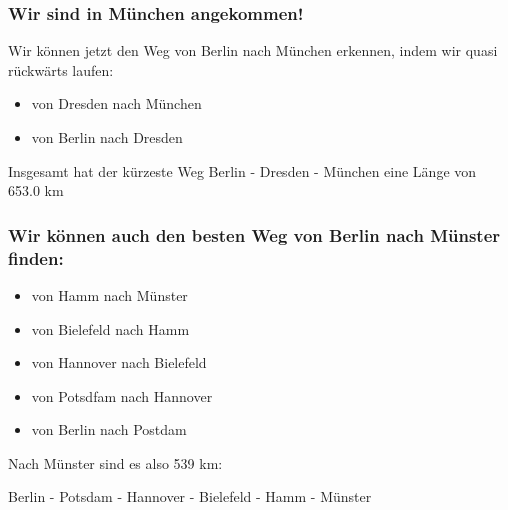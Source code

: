 \documentclass[11pt]{article}
\makeatletter
\providecommand{\tightlist}{%
      \setlength{\itemsep}{0pt}\setlength{\parskip}{0pt}}
\newcommand{\boxspacing}{\kern\kvtcb@left@rule\kern\kvtcb@boxsep}
\newcommand{\prompt}[4]{
        {\ttfamily\llap{{\color{#2}[#3]:\hspace{3pt}#4}}\vspace{-\baselineskip}}
    }
\makeatother
\begin{document}
    \hypertarget{wir-sind-in-muxfcnchen-angekommen}{%
\subsubsection{Wir sind in München
angekommen!}\label{wir-sind-in-muxfcnchen-angekommen}}

    Wir können jetzt den Weg von Berlin nach München erkennen, indem wir
quasi rückwärts laufen:

\begin{itemize}
\tightlist
\item
  von Dresden nach München
\item
  von Berlin nach Dresden
\end{itemize}

Insgesamt hat der kürzeste Weg Berlin - Dresden - München eine Länge von
653.0 km

    \hypertarget{wir-kuxf6nnen-auch-den-besten-weg-von-berlin-nach-muxfcnster-finden}{%
\subsubsection{Wir können auch den besten Weg von Berlin nach Münster
finden:}\label{wir-kuxf6nnen-auch-den-besten-weg-von-berlin-nach-muxfcnster-finden}}

    \begin{itemize}
\tightlist
\item
  von Hamm nach Münster
\item
  von Bielefeld nach Hamm
\item
  von Hannover nach Bielefeld
\item
  von Potsdfam nach Hannover
\item
  von Berlin nach Postdam
\end{itemize}

Nach Münster sind es also 539 km:

Berlin - Potsdam - Hannover - Bielefeld - Hamm - Münster

    \begin{tcolorbox}[breakable, size=fbox, boxrule=1pt, pad at break*=1mm,colback=cellbackground, colframe=cellborder]
\prompt{In}{incolor}{ }{\boxspacing}
\begin{Verbatim}[commandchars=\\\{\}]

\end{Verbatim}
\end{tcolorbox}

    \begin{tcolorbox}[breakable, size=fbox, boxrule=1pt, pad at break*=1mm,colback=cellbackground, colframe=cellborder]
\prompt{In}{incolor}{ }{\boxspacing}
\begin{Verbatim}[commandchars=\\\{\}]

\end{Verbatim}
\end{tcolorbox}


    
    
    
\end{document}
